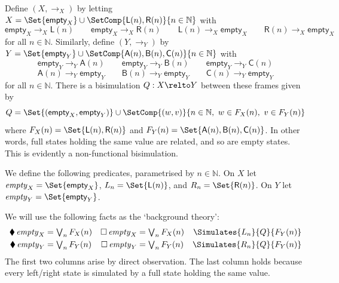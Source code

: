 Define $(X, \to_X)$ by letting
\(
  X = \Set{\textsf{empty}_X} \cup \SetComp{\textsf{L}(n), \textsf{R}(n)}{n \in \mathbb{N}}
\)
with 
\[
  \textsf{empty}_X \to_X \textsf{L}(n)
  \qquad
  \textsf{empty}_X \to_X \textsf{R}(n)
  \qquad
  \textsf{L}(n) \to_X \textsf{empty}_X
  \qquad
  \textsf{R}(n) \to_X \textsf{empty}_X
\]
for all \(n \in \mathbb{N}\). Similarly, define $(Y, \to_Y)$ by 
\(
  Y = \Set{\textsf{empty}_Y} \cup \SetComp{\textsf{A}(n), \textsf{B}(n), \textsf{C}(n)}{n \in \mathbb{N}}
\)
with
\[
  \textsf{empty}_Y \to_Y \textsf{A}(n)
  \qquad
  \textsf{empty}_Y \to_Y \textsf{B}(n)
  \qquad
  \textsf{empty}_Y \to_Y \textsf{C}(n)
\]
\[
  \textsf{A}(n) \to_Y \textsf{empty}_Y
  \qquad
  \textsf{B}(n) \to_Y \textsf{empty}_Y
  \qquad
  \textsf{C}(n) \to_Y \textsf{empty}_Y
\]
for all \(n \in \mathbb{N}\). There is a bisimulation \(Q : X \relto Y\) between
these frames given by
\[
  Q = \Set{(\textsf{empty}_X, \textsf{empty}_Y)} \cup \SetComp{(w, v)}{n \in \mathbb{N},\ w \in F_X(n),\ v \in F_Y(n)}
\]
where \(F_X(n) = \Set{\textsf{L}(n), \textsf{R}(n)}\) and \(F_Y(n) =
\Set{\textsf{A}(n), \textsf{B}(n), \textsf{C}(n)}\). In other words, full states
holding the same value are related, and so are empty states. This is evidently a
non-functional bisimulation.

We define the following predicates, parametrised by \(n \in \mathbb{N}\). On
\(X\) let \(\mathit{empty}_X = \Set{\textsf{empty}_X}\), \(L_n =
\Set{\textsf{L}(n)}\), and \(R_n = \Set{\textsf{R}(n)}\). On \(Y\) let
\(\mathit{empty}_Y = \Set{\textsf{empty}_Y}\).

We will use the following facts as the `background theory':
\begin{align*}
  \blacklozenge\, \mathit{empty}_X &= \textstyle\bigvee_{n} F_X(n)
  &
  \Box\, \mathit{empty}_X &= \textstyle\bigvee_n F_X(n)
  &
  \Simulates{L_n}{Q}{F_Y(n)}
  \\
  \blacklozenge\, \mathit{empty}_Y &= \textstyle\bigvee_n F_Y(n)
  &
  \Box\, \mathit{empty}_Y &= \textstyle\bigvee_n F_Y(n)
  &
  \Simulates{R_n}{Q}{F_Y(n)}
\end{align*}
The first two columns arise by direct observation. The last column holds because
every left/right state is simulated by a full state holding the same value.


